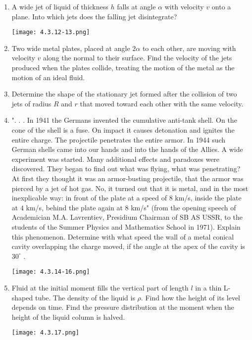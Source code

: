 \documentclass{article}
\begin{document}
\begin{enumerate}[label=4.3.\arabic*]
\item A wide jet of liquid of thickness $h$ falls at angle $\alpha$ with velocity $v$ onto a plane. Into which jets does the falling jet disintegrate?

\begin{center}
    \texttt{[image: 4.3.12-13.png]}
\end{center}

\item Two wide metal plates, placed at angle $2 \alpha$ to each other, are moving with velocity $v$ along the normal to their surface. Find the velocity of the jets produced when the plates collide, treating the motion of the metal as the motion of an ideal fluid.

\item Determine the shape of the stationary jet formed after the collision of two jets of radius $R$ and $r$ that moved toward each other with the same velocity.   

\item ". . . In 1941 the Germans invented the cumulative anti-tank shell. On the cone of the shell is a fuse. On impact it causes detonation and ignites the entire charge. The projectile penetrates the entire armor. In 1944 such German shells came into our hands and into the hands of the Allies. A wide experiment was started. Many additional effects and paradoxes were discovered. They began to find out what was flying, what was penetrating? At first they thought it was an armor-busting projectile, that the armor was pierced by a jet of hot gas. No, it turned out that it is metal, and in the most inexplicable way: in front of the plate at a speed of $8$ km/s, inside the plate at $4$ km/s, behind the plate again at $8$ km/s" (from the opening speech of Academician M.A. Lavrentiev, Presidium Chairman of SB AS USSR, to the students of the Summer Physics and Mathematics School in 1971). Explain this phenomenon. Determine with what speed the wall of a metal conical cavity overlapping the charge moved, if the angle at the apex of the cavity is $30^{\circ}$ . 

\begin{center}
    \texttt{[image: 4.3.14-16.png]}
\end{center}

\item Fluid at the initial moment fills the vertical part of length $l$ in a thin L-shaped tube. The density of the liquid is $\rho$. Find how the height of its level depends on time. Find the pressure distribution at the moment when the height of the liquid column is halved.
\begin{center}
    \texttt{[image: 4.3.17.png]}
\end{center}


\end{enumerate}
\end{document}
